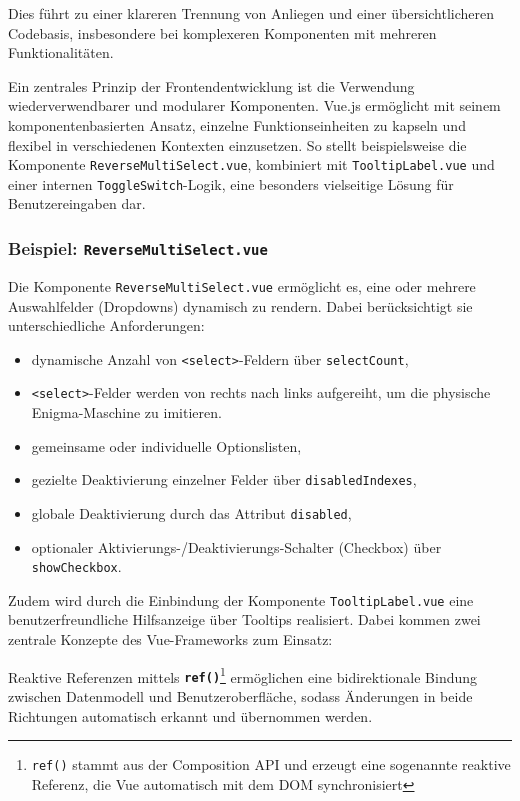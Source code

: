 \documentclass[12pt, ngerman, a4paper, numbers=noenddot]{article}
\begin{document}
Dies führt zu einer klareren Trennung von Anliegen und einer übersichtlicheren Codebasis, insbesondere bei komplexeren Komponenten mit mehreren Funktionalitäten.

Ein zentrales Prinzip der Frontendentwicklung ist die Verwendung wiederverwendbarer und modularer Komponenten. Vue.js ermöglicht mit seinem komponentenbasierten Ansatz, einzelne Funktionseinheiten zu kapseln und flexibel in verschiedenen Kontexten einzusetzen. So stellt beispielsweise die Komponente \newline \lstinline|ReverseMultiSelect.vue|, kombiniert mit \lstinline|TooltipLabel.vue| und einer internen \lstinline|ToggleSwitch|-Logik, eine besonders vielseitige Lösung für Benutzereingaben dar.

\subsubsection*{Beispiel: \lstinline|ReverseMultiSelect.vue|}

Die Komponente \lstinline|ReverseMultiSelect.vue| ermöglicht es, eine oder mehrere Auswahlfelder (Dropdowns) dynamisch zu rendern. Dabei berücksichtigt sie unterschiedliche Anforderungen:

\begin{itemize}
	\item dynamische Anzahl von \lstinline|<select>|-Feldern über \lstinline|selectCount|,
	\item \lstinline|<select>|-Felder werden von rechts nach links aufgereiht, um die physische Enigma-Maschine zu imitieren.
	\item gemeinsame oder individuelle Optionslisten,
	\item gezielte Deaktivierung einzelner Felder über \lstinline|disabledIndexes|,
	\item globale Deaktivierung durch das Attribut \lstinline|disabled|,
	\item optionaler Aktivierungs-/Deaktivierungs-Schalter (Checkbox) über \newline\lstinline|showCheckbox|.
\end{itemize}

Zudem wird durch die Einbindung der Komponente \lstinline|TooltipLabel.vue| eine benutzerfreundliche Hilfsanzeige über Tooltips realisiert. Dabei kommen zwei zentrale Konzepte des Vue-Frameworks zum Einsatz: 

Reaktive Referenzen mittels \textbf{\lstinline|ref()|}\footnote{\texttt{ref()} stammt aus der Composition API und erzeugt eine sogenannte reaktive Referenz, die Vue automatisch mit dem DOM synchronisiert} ermöglichen eine bidirektionale Bindung zwischen Datenmodell und Benutzeroberfläche, sodass Änderungen in beide Richtungen automatisch erkannt und übernommen werden. 
\end{document}
